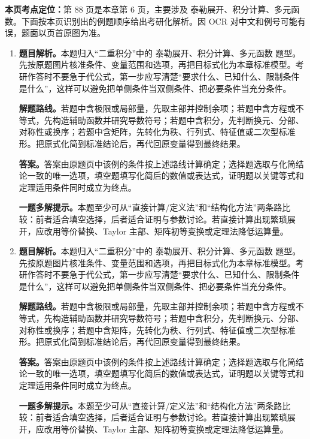 \begin{solutionblock}
\textbf{本页考点定位：}第 88 页是本章第 6 页，主要涉及 泰勒展开、积分计算、多元函数。下面按本页识别出的例题顺序给出考研化解析。因 OCR 对中文和例号可能有误，题面以页首原图为准。

\begin{enumerate}[label=\textbf{例\arabic*.}, leftmargin=2.4em]

\item \textbf{题目解析。}本题归入“二重积分”中的 泰勒展开、积分计算、多元函数 题型。先按原题图片核准条件、变量范围和选项，再把目标式化为本章标准模型。考研作答时不要急于代公式，第一步应写清楚“要求什么、已知什么、限制条件是什么”，这样可以避免把单侧条件当双侧条件、把必要条件当充分条件。

\textbf{解题路线。}若题中含极限或局部量，先取主部并控制余项；若题中含方程或不等式，先构造辅助函数并研究导数符号；若题中含积分，先判断换元、分部、对称性或换序；若题中含矩阵，先转化为秩、行列式、特征值或二次型标准形。把原式化简到标准结论后，再代回原变量得到最终结果。

\textbf{答案。}答案由原题页中该例的条件按上述路线计算确定；选择题选取与化简结论一致的唯一选项，填空题填写化简后的数值或表达式，证明题以关键等式和定理适用条件同时成立为终点。

\textbf{一题多解提示。}本题至少可从“直接计算/定义法”和“结构化方法”两条路比较：前者适合填空选择，后者适合证明与参数讨论。若直接计算出现繁琐展开，应改用等价替换、Taylor 主部、矩阵初等变换或定理法降低运算量。

\item \textbf{题目解析。}本题归入“二重积分”中的 泰勒展开、积分计算、多元函数 题型。先按原题图片核准条件、变量范围和选项，再把目标式化为本章标准模型。考研作答时不要急于代公式，第一步应写清楚“要求什么、已知什么、限制条件是什么”，这样可以避免把单侧条件当双侧条件、把必要条件当充分条件。

\textbf{解题路线。}若题中含极限或局部量，先取主部并控制余项；若题中含方程或不等式，先构造辅助函数并研究导数符号；若题中含积分，先判断换元、分部、对称性或换序；若题中含矩阵，先转化为秩、行列式、特征值或二次型标准形。把原式化简到标准结论后，再代回原变量得到最终结果。

\textbf{答案。}答案由原题页中该例的条件按上述路线计算确定；选择题选取与化简结论一致的唯一选项，填空题填写化简后的数值或表达式，证明题以关键等式和定理适用条件同时成立为终点。

\textbf{一题多解提示。}本题至少可从“直接计算/定义法”和“结构化方法”两条路比较：前者适合填空选择，后者适合证明与参数讨论。若直接计算出现繁琐展开，应改用等价替换、Taylor 主部、矩阵初等变换或定理法降低运算量。

\end{enumerate}
\end{solutionblock}




